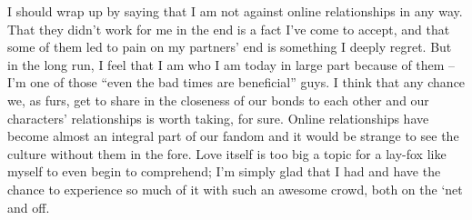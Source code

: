 I should wrap up by saying that I am not against online relationships in any way. That they didn't work for me in the end is a fact I've come to accept, and that some of them led to pain on my partners' end is something I deeply regret. But in the long run, I feel that I am who I am today in large part because of them -- I'm one of those “even the bad times are beneficial” guys. I think that any chance we, as furs, get to share in the closeness of our bonds to each other and our characters' relationships is worth taking, for sure. Online relationships have become almost an integral part of our fandom and it would be strange to see the culture without them in the fore. Love itself is too big a topic for a lay-fox like myself to even begin to comprehend; I'm simply glad that I had and have the chance to experience so much of it with such an awesome crowd, both on the ‘net and off.
